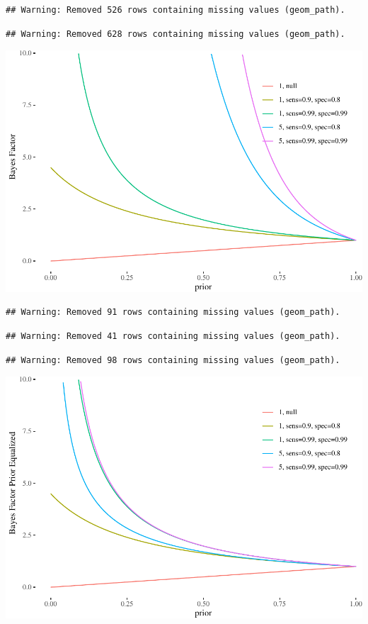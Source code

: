 \documentclass[10pt,dvipsnames,enabledeprecatedfontcommands]{scrartcl}
\begin{document}
\begin{verbatim}
## Warning: Removed 526 rows containing missing values (geom_path).
\end{verbatim}

\begin{verbatim}
## Warning: Removed 628 rows containing missing values (geom_path).
\end{verbatim}

\begin{center}\includegraphics[width=0.9\linewidth]{conjunction-paradox_files/figure-latex/unnamed-chunk-15-1} \end{center}

\begin{verbatim}
## Warning: Removed 91 rows containing missing values (geom_path).
\end{verbatim}

\begin{verbatim}
## Warning: Removed 41 rows containing missing values (geom_path).
\end{verbatim}

\begin{verbatim}
## Warning: Removed 98 rows containing missing values (geom_path).
\end{verbatim}

\begin{center}\includegraphics[width=0.9\linewidth]{conjunction-paradox_files/figure-latex/unnamed-chunk-16-1} \end{center}
\end{document}
